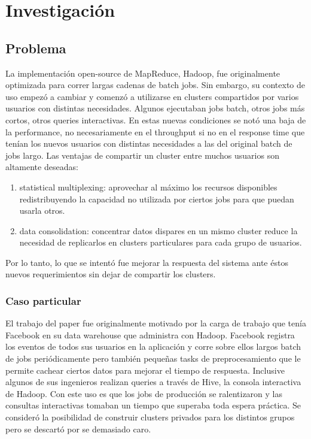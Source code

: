 \section{Investigación}

\subsection{Problema}
La implementación open-source de MapReduce, Hadoop, fue originalmente optimizada
para correr largas cadenas de batch jobs. Sin embargo, su contexto de uso empezó 
a cambiar y comenzó a utilizarse en clusters compartidos por varios usuarios con
distintas necesidades. Algunos ejecutaban jobs batch, otros jobs más cortos,
otros queries interactivas. En estas nuevas condiciones se notó una baja de la
performance, no necesariamente en el throughput si no en el response time
que tenían los nuevos usuarios con distintas necesidades a las del original 
batch de jobs largo.  Las ventajas de compartir un cluster entre muchos
usuarios son altamente deseadas:
\begin{enumerate}
  \item statistical multiplexing: aprovechar al máximo los recursos disponibles 
    redistribuyendo la capacidad no utilizada por ciertos jobs para que puedan 
    usarla otros.
  \item data consolidation: concentrar datos dispares en un mismo cluster reduce
    la necesidad de replicarlos en clusters particulares para cada grupo de usuarios.
\end{enumerate}
Por lo tanto, lo que se intentó fue mejorar la respuesta del sistema
ante éstos nuevos requerimientos sin dejar de compartir los clusters.

\subsubsection{Caso particular}
El trabajo del paper fue originalmente motivado por la carga de trabajo que tenía
Facebook en su data warehouse que administra con Hadoop. Facebook registra los
eventos de todos sus usuarios en la aplicación y corre sobre ellos largos 
batch de jobs periódicamente pero también pequeñas tasks de preprocesamiento
que le permite cachear ciertos datos para mejorar el tiempo de respuesta. Inclusive
algunos de sus ingenieros realizan queries a través de Hive, la consola interactiva
de Hadoop. Con este uso es que los jobs de producción se ralentizaron y las
consultas interactivas tomaban un tiempo que superaba toda espera práctica.
Se consideró la posibilidad de construir clusters privados para los distintos
grupos pero se descartó por se demasiado caro.

